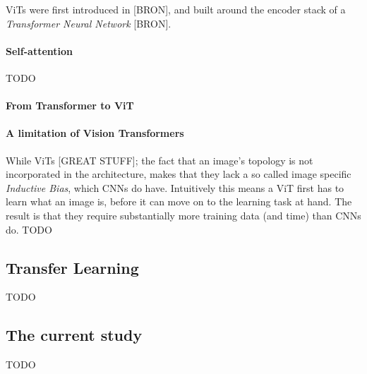 ViTs were first introduced in [BRON], and built around the encoder stack of a \textit{Transformer Neural Network} [BRON].

\paragraph{Self-attention}
TODO

\paragraph{From Transformer to ViT}


\paragraph{A limitation of Vision Transformers}
While ViTs [GREAT STUFF]; the fact that an image's topology is not incorporated in the architecture, makes that they lack a so called image specific \textit{Inductive Bias}, which CNNs do have. Intuitively this means a ViT first has to learn what an image is, before it can move on to the learning task at hand. The result is that they require substantially more training data (and time) than CNNs do. 
TODO


\subsection{Transfer Learning}
TODO

\subsection{The current study}
TODO
